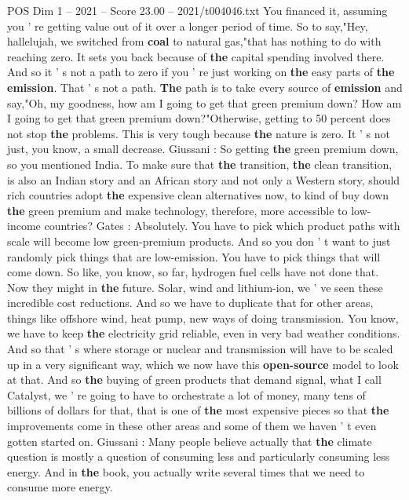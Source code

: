 \begin{textsample}{POS Dim 1 – 2021 – Score 23.00 – 2021/t004046.txt}
You financed it, assuming you ' re getting value out of it over a longer period of time.
So to say,"Hey, hallelujah, we switched from \textbf{coal} to natural gas,"that has nothing to do with reaching zero.
It sets you back because of \textbf{the} capital spending involved there.
And so it ' s not a path to zero if you ' re just working on \textbf{the} easy parts of \textbf{the} \textbf{emission}.
That ' s not a path. \textbf{The} path is to take every source of \textbf{emission} and say,"Oh, my goodness, how am I going to get that green premium down?
How am I going to get that green premium down?"Otherwise, getting to 50 percent does not stop \textbf{the} problems.
This is very tough because \textbf{the} nature is zero.
It ' s not just, you know, a small decrease.
Giussani : So getting \textbf{the} green premium down, so you mentioned India.
To make sure that \textbf{the} transition, \textbf{the} clean transition, is also an Indian story and an African story and not only a Western story, should rich countries adopt \textbf{the} expensive clean alternatives now, to kind of buy down \textbf{the} green premium and make technology, therefore, more accessible to low-income countries?
Gates : Absolutely.
You have to pick which product paths with scale will become low green-premium products.
And so you don ' t want to just randomly pick things that are low-emission.
You have to pick things that will come down.
So like, you know, so far, hydrogen fuel cells have not done that.
Now they might in \textbf{the} future.
Solar, wind and lithium-ion, we ' ve seen these incredible cost reductions.
And so we have to duplicate that for other areas, things like offshore wind, heat pump, new ways of doing transmission.
You know, we have to keep \textbf{the} electricity grid reliable, even in very bad weather conditions.
And so that ' s where storage or nuclear and transmission will have to be scaled up in a very significant way, which we now have this \textbf{open-source} model to look at that.
And so \textbf{the} buying of green products that demand signal, what I call Catalyst, we ' re going to have to orchestrate a lot of money, many tens of billions of dollars for that, that is one of \textbf{the} most expensive pieces so that \textbf{the} improvements come in these other areas and some of them we haven ' t even gotten started on.
Giussani : Many people believe actually that \textbf{the} climate question is mostly a question of consuming less and particularly consuming less energy.
And in \textbf{the} book, you actually write several times that we need to consume more energy.

\end{textsample}
